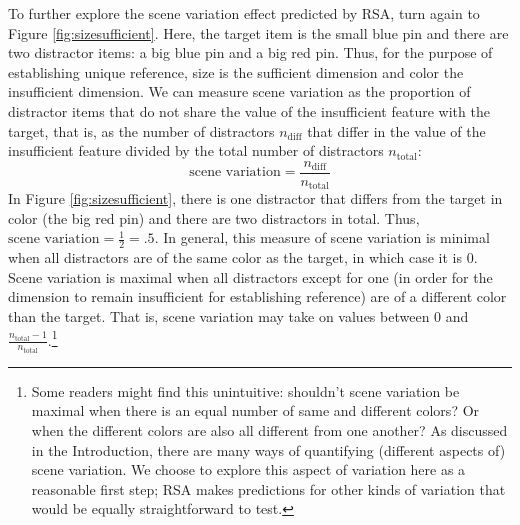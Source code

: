\documentclass[11pt]{article}
\newcommand{\figref}[1]{Figure \ref{#1}}
\begin{document}
To further explore the scene variation effect predicted by RSA, turn again to \figref{fig:sizesufficient}. Here, the target item is the small blue pin and there are two distractor items: a big blue pin and a big red pin. Thus, for the purpose of establishing unique reference, size is the sufficient dimension and color the insufficient dimension. 
We can measure scene variation as the proportion of distractor items that do not share the value of the insufficient feature with the target, that is, as the number of distractors $n_{\textrm{diff}}$ that differ in the value of the insufficient feature divided by the total number of distractors $n_{\textrm{total}}$:
\begin{equation*}
	\textrm{scene variation} = \frac{n_{\textrm{diff}}}{n_{\textrm{total}}}
\end{equation*}
In \figref{fig:sizesufficient}, there is one distractor that differs from the target in color (the big red pin) and there are two distractors in total.  Thus, $\textrm{scene variation} = \frac{1}{2} = .5$. In general, this measure of scene variation is minimal when all distractors are of the same color as the target, in which case it is 0. Scene variation is maximal when all distractors except for one (in order for the dimension to remain insufficient for establishing reference) are of a different color than the target. That is, scene variation may take on values between 0 and $\frac{n_{\textrm{total}} - 1}{n_{\textrm{total}}}$.\footnote{Some readers might find this unintuitive: shouldn't scene variation be maximal when there is an equal number of same and different colors? Or when the different colors are also all different from one another? As discussed in the Introduction, there are many ways of quantifying (different aspects of) scene variation. We choose to explore this aspect of variation here as a reasonable first step; RSA makes predictions for other kinds of variation that would be equally straightforward to test.}
\end{document}
